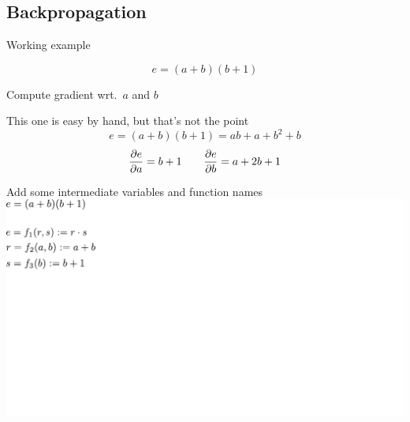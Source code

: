 \documentclass[12pt,aspectratio=169,handout]{beamer}
\begin{document}
\subsection{Backpropagation}

\begin{frame}{Working example}
	
	$$
	e = (a + b)(b + 1)
	$$
	
	Compute gradient wrt.\ $a$ and $b$
	
	\bigskip
	
	\pause
	
	\begin{block}{This one is easy by hand, but that's not the point}
		$$
		e = (a + b)(b + 1) = ab + a + b^2 + b
		$$
		$$
		\pdv{e}{a} = b + 1 \qquad \pdv{e}{b} = a + 2b + 1
		$$
	\end{block}
	
\end{frame}



\begin{frame}{Add some intermediate variables and function names}
	\includegraphics[width=1.1\linewidth]{img/backprop01.pdf}
\end{frame}
\end{document}
